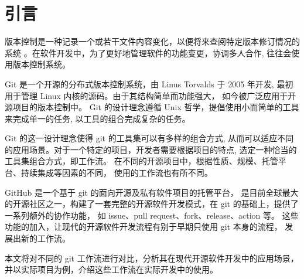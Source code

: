 \documentclass[../main.tex]{subfiles}
\begin{document}
\section{引言}

版本控制是一种记录一个或若干文件内容变化，以便将来查阅特定版本修订情况的系统
\cite{progit}。在软件开发中，为了更好地管理软件的功能变更，协调多人合作,
往往会使用版本控制系统。

Git 是一个开源的分布式版本控制系统，由 Linus Torvalds 于 2005 年开发,
最初用于管理 Linux 内核的源码。由于其结构简单而功能强大，
如今被广泛应用于开源项目的版本控制中。
Git 的设计理念遵循 Unix 哲学，提倡使用小而简单的工具来完成单一的任务,
以工具的组合完成复杂的任务。

Git 的这一设计理念使得 git 的工具集可以有多样的组合方式,
从而可以适应不同的应用场景。对于一个特定的项目，开发者需要根据项目的特点,
选定一种恰当的工具集组合方式，即工作流。
在不同的开源项目中，根据性质、规模、托管平台、持续集成等因素的不同，
使用的工作流也有所不同。

GitHub 是一个基于 git 的面向开源及私有软件项目的托管平台，
是目前全球最大的开源社区之一，构建了一套完整的开源软件开发模式，在 git 的基础上，提供了一系列额外的协作功能，
如 issue、pull request、fork、release、action 等。
这些功能的加入，让现代的开源软件开发流程有别于早期只使用 git 本身的流程，
发展出新的工作流。

本文将对不同的 git 工作流进行对比，分析其在现代开源软件开发中的应用场景，
并以实际项目为例，介绍这些工作流在实际开发中的使用。
\end{document}
